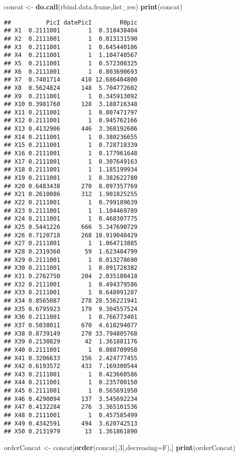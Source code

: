 \documentclass[
]{article}
\newenvironment{Shaded}{\begin{snugshade}}{\end{snugshade}}
\newcommand{\DataTypeTok}[1]{\textcolor[rgb]{0.13,0.29,0.53}{#1}}
\newcommand{\DecValTok}[1]{\textcolor[rgb]{0.00,0.00,0.81}{#1}}
\newcommand{\KeywordTok}[1]{\textcolor[rgb]{0.13,0.29,0.53}{\textbf{#1}}}
\newcommand{\NormalTok}[1]{#1}
\newcommand{\StringTok}[1]{\textcolor[rgb]{0.31,0.60,0.02}{#1}}
\begin{document}
\begin{Shaded}
\begin{Highlighting}[]
\NormalTok{concat <-}\StringTok{ }\KeywordTok{do.call}\NormalTok{(rbind.data.frame,list_res)}
\KeywordTok{print}\NormalTok{(concat)}
\end{Highlighting}
\end{Shaded}

\begin{verbatim}
##          PicI datePicI        R0pic
## X1  0.2111001        1  0.318438404
## X2  0.2111001        1  0.013131590
## X3  0.2111001        1  0.645440186
## X4  0.2111001        1  1.104740567
## X5  0.2111001        1  0.572300325
## X6  0.2111001        1  0.803690693
## X7  0.7401714      410 12.686404800
## X8  0.5624824      148  5.704772602
## X9  0.2111001        1  0.345913092
## X10 0.3981760      128  3.188716348
## X11 0.2111001        1  0.007471797
## X12 0.2111001        1  0.945762166
## X13 0.4132906      446  3.368192606
## X14 0.2111001        1  0.380236655
## X15 0.2111001        1  0.728718339
## X16 0.2111001        1  0.177961648
## X17 0.2111001        1  0.307649163
## X18 0.2111001        1  1.185199934
## X19 0.2111001        1  0.382622780
## X20 0.6483438      270  8.097357769
## X21 0.2610086      312  1.901825255
## X22 0.2111001        1  0.799189639
## X23 0.2111001        1  1.104469789
## X24 0.2111001        1  0.468307775
## X25 0.5441226      666  5.347690729
## X26 0.7120718      268 10.919040429
## X27 0.2111001        1  1.064713885
## X28 0.2319360       59  1.623404799
## X29 0.2111001        1  0.013278690
## X30 0.2111001        1  0.091728382
## X31 0.2762750      204  2.035180418
## X32 0.2111001        1  0.494379586
## X33 0.2111001        1  0.648991287
## X34 0.8565087      278 28.536221941
## X35 0.6795923      179  9.304557524
## X36 0.2111001        1  0.766773401
## X37 0.5038011      670  4.618294077
## X38 0.8739149      270 33.794805768
## X39 0.2130829       42  1.361881176
## X40 0.2111001        1  0.088709958
## X41 0.3206633      156  2.424777455
## X42 0.6193572      433  7.169300544
## X43 0.2111001        1  0.423660586
## X44 0.2111001        1  0.235700150
## X45 0.2111001        1  0.565691950
## X46 0.4290094      137  3.545692234
## X47 0.4132284      276  3.365101536
## X48 0.2111001        1  0.457585499
## X49 0.4342591      494  3.620742513
## X50 0.2131979       13  1.361861890
\end{verbatim}

\begin{Shaded}
\begin{Highlighting}[]
\NormalTok{orderConcat <-}\StringTok{ }\NormalTok{concat[}\KeywordTok{order}\NormalTok{(concat[,}\DecValTok{3}\NormalTok{],}\DataTypeTok{decreasing=}\NormalTok{F),]}
\KeywordTok{print}\NormalTok{(orderConcat)}
\end{Highlighting}
\end{Shaded}
\end{document}

